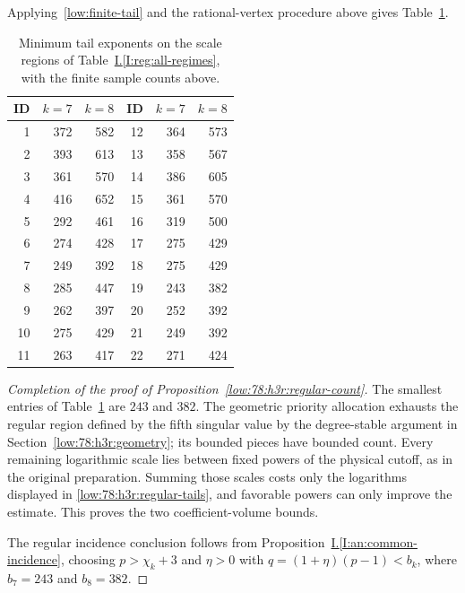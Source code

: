 \documentclass[11pt]{amsart}
\theoremstyle{definition}
\theoremstyle{remark}
\numberwithin{equation}{section}
\newcommand{\partIref}[1]{\hyperref[I:#1]{I.\ref*{I:#1}}}
\begin{document}
Applying~\eqref{low:finite-tail} and the rational-vertex procedure above gives Table~\ref{low:78:h3r:ledger}.

\begin{longtable}{r rr@{\qquad}r rr}
\caption{Minimum tail exponents on the scale regions of Table~\partIref{reg:all-regimes}, with the finite sample counts above.}\label{low:78:h3r:ledger}\\
\toprule
ID & $k=7$ & $k=8$ & ID & $k=7$ & $k=8$\\\midrule
1 & 372 & 582 & 12 & 364 & 573\\
2 & 393 & 613 & 13 & 358 & 567\\
3 & 361 & 570 & 14 & 386 & 605\\
4 & 416 & 652 & 15 & 361 & 570\\
5 & 292 & 461 & 16 & 319 & 500\\
6 & 274 & 428 & 17 & 275 & 429\\
7 & 249 & 392 & 18 & 275 & 429\\
8 & 285 & 447 & 19 & 243 & 382\\
9 & 262 & 397 & 20 & 252 & 392\\
10 & 275 & 429 & 21 & 249 & 392\\
11 & 263 & 417 & 22 & 271 & 424\\
\bottomrule
\end{longtable}

\begin{proof}[Completion of the proof of Proposition~\ref{low:78:h3r:regular-count}]
The smallest entries of Table~\ref{low:78:h3r:ledger} are $243$ and $382$. The geometric priority allocation exhausts the regular region defined by the fifth singular value by the degree-stable argument in Section~\ref{low:78:h3r:geometry}; its bounded pieces have bounded count. Every remaining logarithmic scale lies between fixed powers of the physical cutoff, as in the original preparation. Summing those scales costs only the logarithms displayed in \eqref{low:78:h3r:regular-tails}, and favorable powers can only improve the estimate. This proves the two coefficient-volume bounds.

The regular incidence conclusion follows from Proposition~\partIref{an:common-incidence}, choosing $p>\chi_k+3$ and $\eta>0$ with $q=(1+\eta)(p-1)<b_k$, where $b_7=243$ and $b_8=382$.
\end{proof}
\end{document}
